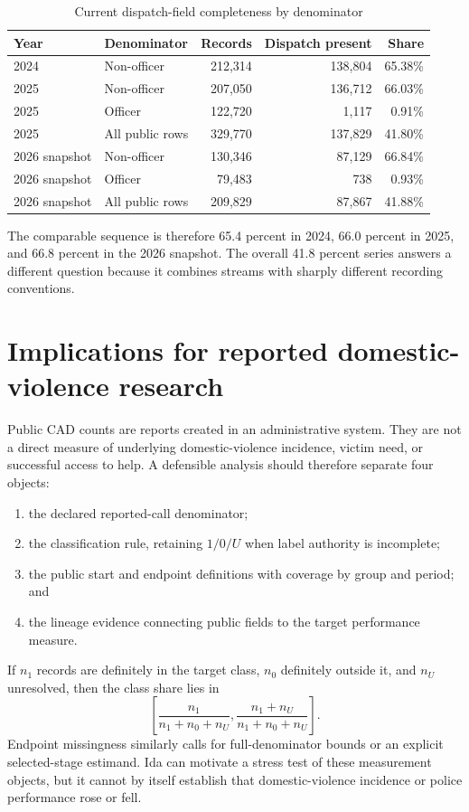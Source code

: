 \documentclass[11pt]{article}
\begin{document}
\begin{table}[t]
\centering
\caption{Current dispatch-field completeness by denominator}
\label{tab:current}
\begin{tabular}{@{}llrrr@{}}
\toprule
Year & Denominator & Records & Dispatch present & Share \\
\midrule
2024 & Non-officer & 212,314 & 138,804 & 65.38\% \\
2025 & Non-officer & 207,050 & 136,712 & 66.03\% \\
2025 & Officer & 122,720 & 1,117 & 0.91\% \\
2025 & All public rows & 329,770 & 137,829 & 41.80\% \\
2026 snapshot & Non-officer & 130,346 & 87,129 & 66.84\% \\
2026 snapshot & Officer & 79,483 & 738 & 0.93\% \\
2026 snapshot & All public rows & 209,829 & 87,867 & 41.88\% \\
\bottomrule
\end{tabular}
\end{table}

The comparable sequence is therefore 65.4 percent in 2024, 66.0 percent in 2025, and 66.8 percent in the 2026 snapshot. The overall 41.8 percent series answers a different question because it combines streams with sharply different recording conventions.

\section{Implications for reported domestic-violence research}

Public CAD counts are reports created in an administrative system. They are not a direct measure of underlying domestic-violence incidence, victim need, or successful access to help. A defensible analysis should therefore separate four objects:
\begin{enumerate}
\item the declared reported-call denominator;
\item the classification rule, retaining $1/0/U$ when label authority is incomplete;
\item the public start and endpoint definitions with coverage by group and period; and
\item the lineage evidence connecting public fields to the target performance measure.
\end{enumerate}

If $n_1$ records are definitely in the target class, $n_0$ definitely outside it, and $n_U$ unresolved, then the class share lies in
\begin{equation}
\left[\frac{n_1}{n_1+n_0+n_U},\frac{n_1+n_U}{n_1+n_0+n_U}\right].
\end{equation}
Endpoint missingness similarly calls for full-denominator bounds or an explicit selected-stage estimand. Ida can motivate a stress test of these measurement objects, but it cannot by itself establish that domestic-violence incidence or police performance rose or fell.
\end{document}
